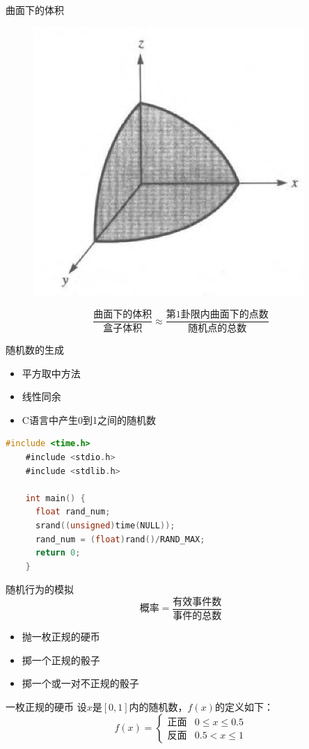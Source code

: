 \documentclass[mathserif, table]{beamer}
\begin{document}
\begin{frame}{曲面下的体积}
  \begin{figure}
    \centering
    \includegraphics[width=.3\textwidth{}]{sphere.png}
  \end{figure}

  \[
  \frac{\text{曲面下的体积}}{\text{盒子体积}} \approx \frac{\text{第1卦限内曲面下的点数}}{\text{随机点的总数}}
  \]
\end{frame}

\begin{frame}[fragile]{随机数的生成}
  \begin{itemize}
  \item 平方取中方法
  \item 线性同余
  \item C语言中产生0到1之间的随机数
  \end{itemize}

  \begin{lstlisting}[language=C]
    #include <time.h>
    #include <stdio.h>
    #include <stdlib.h>

    int main() {
      float rand_num;
      srand((unsigned)time(NULL));
      rand_num = (float)rand()/RAND_MAX;
      return 0;
    }
  \end{lstlisting}

\end{frame}

\begin{frame}{随机行为的模拟}
  \[
  \text{概率} = \frac{\text{有效事件数}}{\text{事件的总数}}
  \]

  \begin{itemize}
  \item 抛一枚正规的硬币
  \item 掷一个正规的骰子
  \item 掷一个或一对不正规的骰子
  \end{itemize}
  
\end{frame}

\begin{frame}{一枚正规的硬币}
  设$x$是$[0,1]$内的随机数，$f(x)$的定义如下：
  \[
  f(x) =
  \begin{cases}
    \text{正面} & 0 \le x \le 0.5\\
    \text{反面} & 0.5 < x \le 1
  \end{cases}
  \]
\end{frame}
\end{document}
